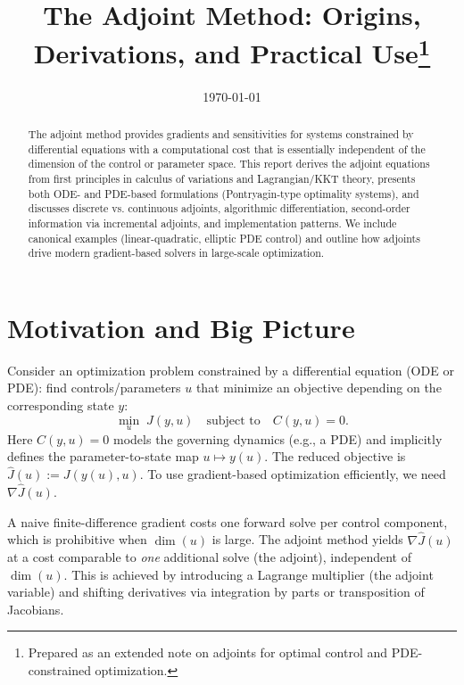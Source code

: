 \documentclass[11pt,a4paper]{article}
\title{The Adjoint Method: Origins, Derivations, and Practical Use\thanks{Prepared as an extended note on adjoints for optimal control and PDE-constrained optimization.}}
\author{ }
\date{\today}
\numberwithin{equation}{section}
\theoremstyle{plain}
\theoremstyle{definition}
\begin{document}
\maketitle
\tableofcontents

\begin{abstract}
The adjoint method provides gradients and sensitivities for systems constrained by differential equations with a computational cost that is essentially independent of the dimension of the control or parameter space. This report derives the adjoint equations from first principles in calculus of variations and Lagrangian/KKT theory, presents both ODE- and PDE-based formulations (Pontryagin-type optimality systems), and discusses discrete vs. continuous adjoints, algorithmic differentiation, second-order information via incremental adjoints, and implementation patterns. We include canonical examples (linear-quadratic, elliptic PDE control) and outline how adjoints drive modern gradient-based solvers in large-scale optimization.
\end{abstract}

\section{Motivation and Big Picture}
Consider an optimization problem constrained by a differential equation (ODE or PDE): find controls/parameters $u$ that minimize an objective depending on the corresponding state $y$:
\begin{equation}
\min_{u} \; J(y,u) \quad \text{subject to} \quad C(y,u) = 0.
\label{eq:opt_general}
\end{equation}
Here $C(y,u)=0$ models the governing dynamics (e.g., a PDE) and implicitly defines the parameter-to-state map $u\mapsto y(u)$. The reduced objective is $\hat J(u) := J(y(u),u)$. To use gradient-based optimization efficiently, we need $\nabla \hat J(u)$.

A naive finite-difference gradient costs one forward solve per control component, which is prohibitive when $\dim(u)$ is large. The adjoint method yields $\nabla \hat J(u)$ at a cost comparable to \emph{one} additional solve (the adjoint), independent of $\dim(u)$. This is achieved by introducing a Lagrange multiplier (the adjoint variable) and shifting derivatives via integration by parts or transposition of Jacobians.
\end{document}
